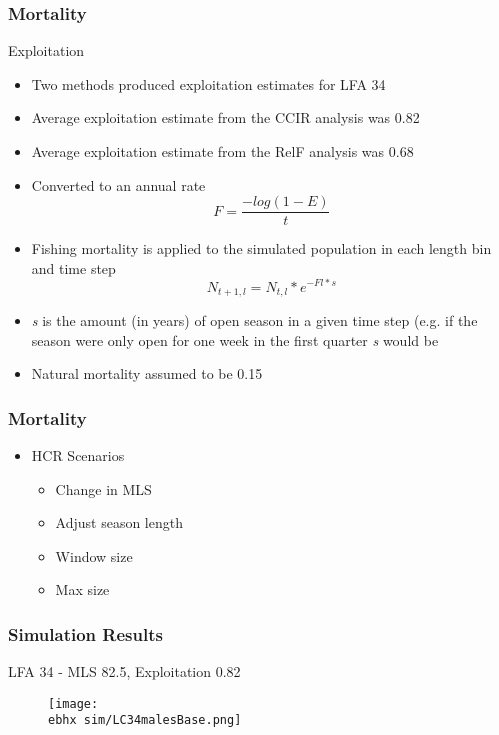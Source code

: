 \documentclass{beamer}
\newcommand{\ebhx}{\string~/bio.data/bio.lobster/figures/LFA3438Framework2019/figures/Brad/} %
\begin{document}
\begin{frame}
\frametitle{Mortality}
Exploitation
\begin{itemize}
\item Two methods produced exploitation estimates for LFA 34 
\item Average exploitation estimate from the CCIR analysis was 0.82 
\item Average exploitation estimate from the RelF analysis was 0.68 
\item Converted to an annual rate 
\begin{equation*}
F = \frac{-log(1-E)}{t}
\end{equation*}
\item Fishing mortality is applied to the simulated population in each length bin and time step
\begin{equation*}
N_{t+1, l} =  N_{t, l} * e^{-Fl * s}
\end{equation*}
\item \textit{s} is the amount (in years) of open season in a given time step (e.g. if the season were only open for one week in the first quarter \textit{s} would be %
\item Natural mortality assumed to be 0.15
\end{itemize}
\end{frame}



\begin{frame}
\frametitle{Mortality}
\begin{itemize}
\item HCR Scenarios
\begin{itemize}
\item Change in MLS
\item Adjust season length
\item Window size
\item Max size
\end{itemize}

\end{itemize}
\end{frame}





\begin{frame}
\frametitle{Simulation Results}
LFA 34 - MLS 82.5, Exploitation 0.82
\begin{figure}
        \begin{center}
            \texttt{[image: \\ebhx sim/LC34malesBase.png]}
        \end{center}
    \end{figure}
\end{frame}
\end{document}
